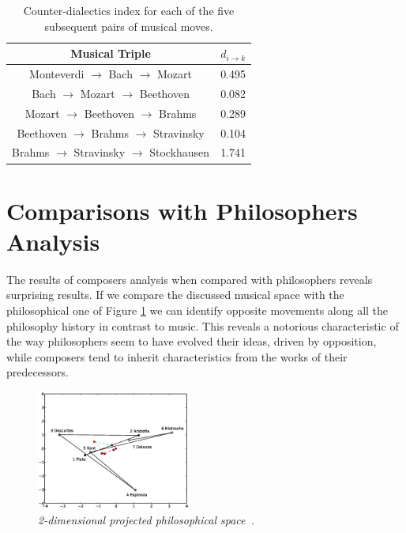 \documentclass[
 aip,
 jmp,
 amsmath,amssymb,
 reprint,
]{revtex4-1}
\begin{document}
\begin{table}[ht]
\caption{\label{tab:tableE} Counter-dialectics index for each
of the five subsequent pairs of musical moves.}

\begin{tabular}{|c||c|}
\hline
Musical Triple & $d_{i \rightarrow k}$ \\
\hline \hline

 Monteverdi $\to$ Bach $\to$ Mozart          &     0.495  \\
 Bach $\to$ Mozart $\to$ Beethoven           &     0.082  \\
 Mozart $\to$ Beethoven $\to$ Brahms         &     0.289  \\
 Beethoven $\to$ Brahms $\to$ Stravinsky     &     0.104  \\
 Brahms $\to$ Stravinsky $\to$ Stockhausen   &     1.741  \\

\hline
\end{tabular}
\end{table}

\section{Comparisons with Philosophers Analysis}

The results of composers analysis when compared with philosophers
reveals surprising results. If we compare the discussed musical space
with the philosophical one of Figure \ref{fig:phipca} we can
identify opposite movements along all the philosophy history in contrast
to music. This reveals a notorious characteristic of the way
philosophers seem to have evolved their ideas, driven by opposition, while
composers tend to inherit characteristics from the works of their
predecessors.

\begin{figure}
  \begin{center}
    \includegraphics[width=0.45\textwidth]{images/g1filosofos}
  \end{center}
  \caption{\it 2-dimensional projected philosophical space~\cite{Fabbri}.}
  \label{fig:phipca}
\end{figure}
\end{document}
